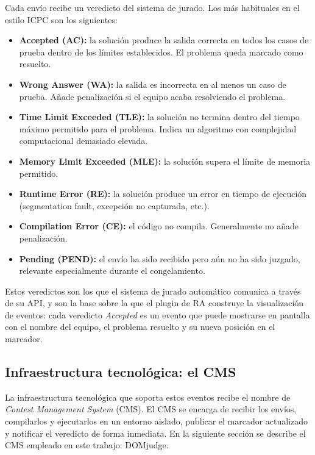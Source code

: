 Cada envío recibe un veredicto del sistema de jurado. Los más habituales en el estilo ICPC son los siguientes:

\begin{itemize}
  \item \textbf{Accepted (AC):} la solución produce la salida correcta en todos los casos de prueba dentro de los límites establecidos. El problema queda marcado como resuelto.
  \item \textbf{Wrong Answer (WA):} la salida es incorrecta en al menos un caso de prueba. Añade penalización si el equipo acaba resolviendo el problema.
  \item \textbf{Time Limit Exceeded (TLE):} la solución no termina dentro del tiempo máximo permitido para el problema. Indica un algoritmo con complejidad computacional demasiado elevada.
  \item \textbf{Memory Limit Exceeded (MLE):} la solución supera el límite de memoria permitido.
  \item \textbf{Runtime Error (RE):} la solución produce un error en tiempo de ejecución (segmentation fault, excepción no capturada, etc.).
  \item \textbf{Compilation Error (CE):} el código no compila. Generalmente no añade penalización.
  \item \textbf{Pending (PEND):} el envío ha sido recibido pero aún no ha sido juzgado, relevante especialmente durante el congelamiento.
\end{itemize}

Estos veredictos son los que el sistema de jurado automático comunica a través de su API, y son la base sobre la que el plugin de RA construye la visualización de eventos: cada veredicto \textit{Accepted} es un evento que puede mostrarse en pantalla con el nombre del equipo, el problema resuelto y su nueva posición en el marcador.

\subsection{Infraestructura tecnológica: el CMS}

La infraestructura tecnológica que soporta estos eventos recibe el nombre de \textit{Contest Management System} (CMS). El CMS se encarga de recibir los envíos, compilarlos y ejecutarlos en un entorno aislado, publicar el marcador actualizado y notificar el veredicto de forma inmediata. En la siguiente sección se describe el CMS empleado en este trabajo: DOMjudge.


